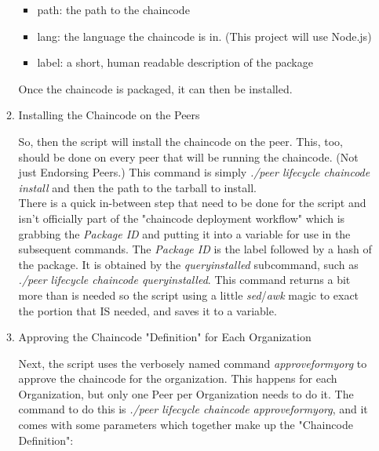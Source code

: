 \begin{itemize}
\begin{enumerate}
									\begin{itemize}
										\item path: the path to the chaincode
										\item lang: the language the chaincode is in. (This project will use Node.js)
										\item label: a short, human readable description of the package
									\end{itemize}							
								
								\hspace{10mm}Once the chaincode is packaged, it can then be installed.
								
							\item Installing the Chaincode on the Peers

								\hspace{10mm}So, then the script will install the chaincode on the peer. This, too, should be done on every peer that will be running the chaincode. (Not just Endorsing Peers.) This command is simply \textit{./peer lifecycle chaincode install} and then the path to the tarball to install.\\
								
								\hspace{10mm}There is a quick in-between step that need to be done for the script and isn't officially part of the "chaincode deployment workflow" which is grabbing the \textit{Package ID} and putting it into a variable for use in the subsequent commands. The \textit{Package ID} is the label followed by a hash of the package. It is obtained by the \textit{queryinstalled} subcommand, such as \textit{./peer lifecycle chaincode queryinstalled}. This command returns a bit more than is needed so the script using a little \textit{sed}/\textit{awk} magic to exact the portion that IS needed, and saves it to a variable. 
							
							\item Approving the Chaincode "Definition" for Each Organization
							
							\hspace{10mm}Next, the script uses the verbosely named command \textit{approveformyorg} to approve the chaincode for the organization. This happens for each Organization, but only one Peer per Organization needs to do it. The command to do this is \textit{./peer lifecycle chaincode approveformyorg}, and it comes with some parameters which together make up the "Chaincode Definition":
							

\end{enumerate}
\end{itemize}
